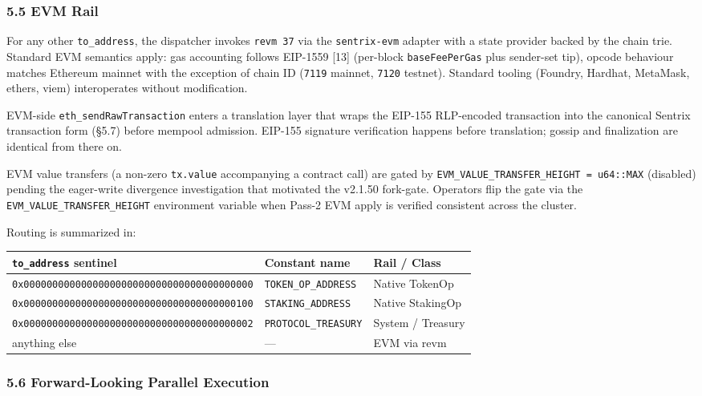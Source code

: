 \documentclass[11pt,a4paper]{article}
\begin{document}
\hypertarget{55-evm-rail}{%
\subsubsection{5.5 EVM Rail}\label{55-evm-rail}}

For any other \texttt{to\_address}, the dispatcher invokes
\texttt{revm\ 37} via the \texttt{sentrix-evm} adapter with a state
provider backed by the chain trie. Standard EVM semantics apply: gas
accounting follows EIP-1559 {[}13{]} (per-block \texttt{baseFeePerGas}
plus sender-set tip), opcode behaviour matches Ethereum mainnet with the
exception of chain ID (\texttt{7119} mainnet, \texttt{7120} testnet).
Standard tooling (Foundry, Hardhat, MetaMask, ethers, viem)
interoperates without modification.

EVM-side \texttt{eth\_sendRawTransaction} enters a translation layer
that wraps the EIP-155 RLP-encoded transaction into the canonical
Sentrix transaction form (§5.7) before mempool admission. EIP-155
signature verification happens before translation; gossip and
finalization are identical from there on.

EVM value transfers (a non-zero \texttt{tx.value} accompanying a
contract call) are gated by
\texttt{EVM\_VALUE\_TRANSFER\_HEIGHT\ =\ u64::MAX} (disabled) pending
the eager-write divergence investigation that motivated the v2.1.50
fork-gate. Operators flip the gate via the
\texttt{EVM\_VALUE\_TRANSFER\_HEIGHT} environment variable when Pass-2
EVM apply is verified consistent across the cluster.

Routing is summarized in:

\begin{longtable}[]{@{}lll@{}}
\toprule\noalign{}
\texttt{to\_address} sentinel & Constant name & Rail / Class \\
\midrule\noalign{}
\endhead
\bottomrule\noalign{}
\endlastfoot
\texttt{0x0000000000000000000000000000000000000000} &
\texttt{TOKEN\_OP\_ADDRESS} & Native TokenOp \\
\texttt{0x0000000000000000000000000000000000000100} &
\texttt{STAKING\_ADDRESS} & Native StakingOp \\
\texttt{0x0000000000000000000000000000000000000002} &
\texttt{PROTOCOL\_TREASURY} & System / Treasury \\
anything else & --- & EVM via revm \\
\end{longtable}

\hypertarget{56-forward-looking-parallel-execution}{%
\subsubsection{5.6 Forward-Looking Parallel
Execution}\label{56-forward-looking-parallel-execution}}
\end{document}

